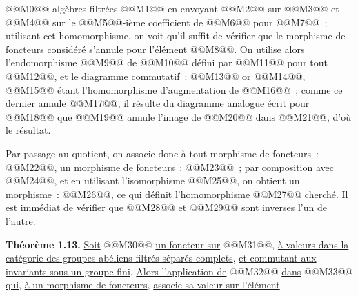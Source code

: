 
@@M0@@-algèbres filtrées @@M1@@ en envoyant @@M2@@ sur @@M3@@ et @@M4@@ sur le @@M5@@-ième coefficient de @@M6@@ pour @@M7@@~; utilisant cet homomorphisme, on voit qu'il suffit de vérifier que le morphisme de foncteurs considéré s'annule pour l'élément @@M8@@. On utilise alors l'endomorphisme @@M9@@ de @@M10@@ défini par @@M11@@ pour tout @@M12@@, et le diagramme commutatif~:
@@M13@@
or @@M14@@, @@M15@@ étant l'homomorphisme d'augmentation de @@M16@@~; comme ce dernier annule @@M17@@, il résulte du diagramme analogue écrit pour @@M18@@ que @@M19@@ annule l'image de @@M20@@ dans @@M21@@, d'où le résultat.

Par passage au quotient, on associe donc à tout morphisme de foncteurs~: @@M22@@, un morphisme de foncteurs~: @@M23@@~; par composition avec @@M24@@, et en utilisant l'isomorphisme @@M25@@, on obtient un morphisme~: @@M26@@, ce qui définit l'homomorphisme @@M27@@ cherché. Il est immédiat de vérifier que @@M28@@ et @@M29@@ sont inverses l'un de l'autre.

\textbf{Théorème 1.13.} \uline{Soit} @@M30@@ \uline{un foncteur sur} @@M31@@, \uline{à valeurs dans la catégorie des groupes abéliens filtrés séparés complets}, \uline{et commutant aux invariants sous un groupe fini}. \uline{Alors l'application de} @@M32@@ \uline{dans} @@M33@@ \uline{qui}, \uline{à un morphisme de foncteurs}, \uline{associe sa valeur sur l'élément} 
